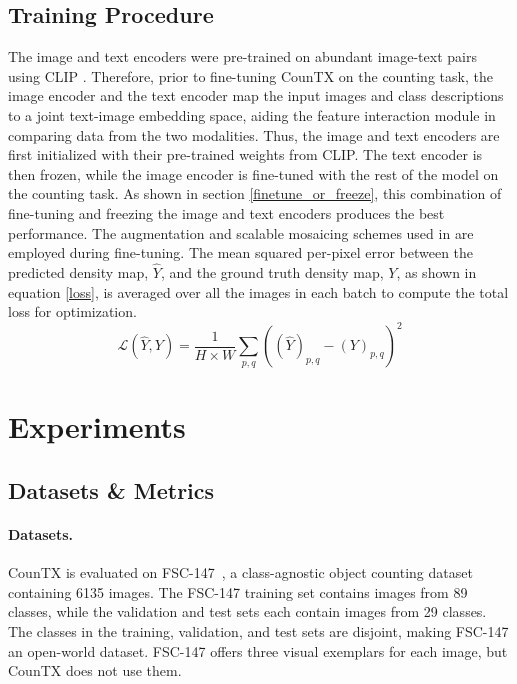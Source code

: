 \documentclass{bmvc2k}
\begin{document}
\subsection{Training Procedure}\label{train}
The image and text encoders were pre-trained on abundant image-text pairs using CLIP \cite{Radford2021LearningTV}. Therefore, prior to fine-tuning CounTX on the counting task, the image encoder and the text encoder map the input images and class descriptions to a joint text-image embedding space, aiding the feature interaction module in comparing data from the two modalities. Thus, the image and text encoders are first initialized with their pre-trained weights from CLIP. The text encoder is then frozen, while the image encoder is fine-tuned with the rest of the model on the counting task. As shown in section \ref{finetune_or_freeze}, this combination of fine-tuning and freezing the image and text encoders produces the best performance. The augmentation and scalable mosaicing schemes used in \cite{Liu2022CounTRTG} are employed during fine-tuning. The mean squared per-pixel error between the predicted density map, $\hat{Y}$, and the ground truth density map, $Y$, as shown in equation \ref{loss}, is averaged over all the images in each batch to compute the total loss for optimization.
\begin{equation}\label{loss}
    \mathcal{L}(\hat{Y}, Y) = \frac{1}{H \times W}\sum_{p, q}((\hat{Y})_{p, q} - (Y)_{p, q})^{2}
\end{equation}
 \section{Experiments}

\subsection{Datasets \& Metrics}
\paragraph{Datasets.}
CounTX is evaluated on FSC-147~\cite{m_Ranjan-etal-CVPR21}, a class-agnostic object counting dataset containing 6135 images. The FSC-147 training set contains images from 89 classes, while the validation and test sets each contain images from 29 classes. The classes in the training, validation, and test sets are disjoint, making FSC-147 an open-world dataset. FSC-147 offers three visual exemplars for each image, but CounTX does not use them. 
\end{document}

